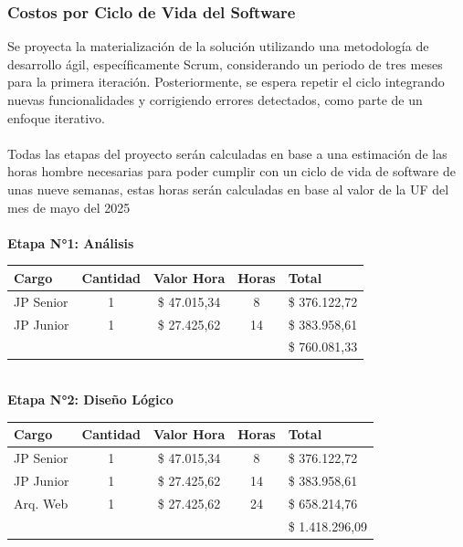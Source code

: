 \documentclass[12pt]{article}
\begin{document}
\subsubsection{Costos por Ciclo de Vida del Software}
Se proyecta la materialización de la solución utilizando una metodología de desarrollo ágil, específicamente Scrum, considerando un periodo de tres meses para la primera iteración. Posteriormente, se espera repetir el ciclo integrando nuevas funcionalidades y corrigiendo errores detectados, como parte de un enfoque iterativo.
\\\\
Todas las etapas del proyecto serán calculadas en base a una estimación de las horas hombre necesarias para poder cumplir con un ciclo de vida de software de unas nueve semanas, estas horas serán calculadas en base al valor de la UF del mes de mayo del 2025\\\\
\textbf{Etapa N°1: Análisis}
\begin{table}[!h]
    \centering
    \begin{tabular}{|p{4cm}|c|c|c|p{3cm}|}
         \hline
         Cargo & Cantidad & Valor Hora & Horas & Total\\
         \hline
         JP Senior & 1 & \$ 47.015,34 & 8 & \$ 376.122,72 \\
         JP Junior & 1 & \$ 27.425,62 & 14 & \$ 383.958,61 \\
         \hline
         & & & & \$ 760.081,33\\
         \hline
    \end{tabular}
\end{table}\\
\textbf{Etapa N°2: Diseño Lógico}
\begin{table}[!h]
    \centering
    \begin{tabular}{|p{4cm}|c|c|c|p{3cm}|}
         \hline
         Cargo & Cantidad & Valor Hora & Horas & Total\\
         \hline
         JP Senior & 1 & \$ 47.015,34 & 8 & \$ 376.122,72 \\
         JP Junior & 1 & \$ 27.425,62 & 14 & \$ 383.958,61 \\
         Arq. Web & 1 & \$ 27.425,62 & 24 & \$ 658.214,76 \\
         \hline
         & & & & \$ 1.418.296,09\\
         \hline
    \end{tabular}
\end{table}\\
\end{document}
